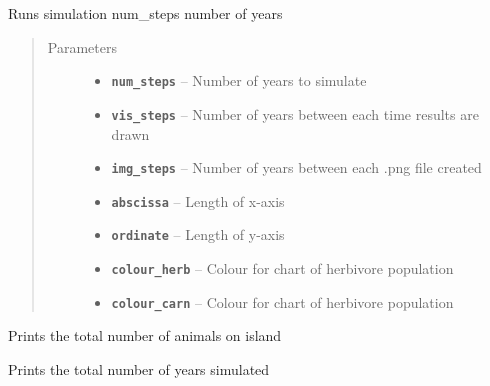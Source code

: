\documentclass[a4paper,10pt,openany,oneside]{sphinxmanual}
\begin{document}
\begin{fulllineitems}
\begin{fulllineitems}
\end{fulllineitems}


\begin{fulllineitems}
\label{simulation:biosim.simulation.BioSim.simulate}
Runs simulation num\_steps number of years
\begin{quote}\begin{description}
\item[{Parameters}] \leavevmode\begin{itemize}
\item {} 
\textbf{\texttt{num\_steps}} -- Number of years to simulate

\item {} 
\textbf{\texttt{vis\_steps}} -- Number of years between each time results are drawn

\item {} 
\textbf{\texttt{img\_steps}} -- Number of years between each .png file created

\item {} 
\textbf{\texttt{abscissa}} -- Length of x-axis

\item {} 
\textbf{\texttt{ordinate}} -- Length of y-axis

\item {} 
\textbf{\texttt{colour\_herb}} -- Colour for chart of herbivore population

\item {} 
\textbf{\texttt{colour\_carn}} -- Colour for chart of herbivore population

\end{itemize}

\end{description}\end{quote}

\end{fulllineitems}


\begin{fulllineitems}
\label{simulation:biosim.simulation.BioSim.total_number_of_animals}
Prints the total number of animals on island

\end{fulllineitems}


\begin{fulllineitems}
\label{simulation:biosim.simulation.BioSim.years_simulated}
Prints the total number of years simulated

\end{fulllineitems}


\end{fulllineitems}
\end{document}
